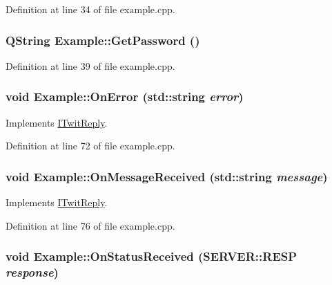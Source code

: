 Definition at line 34 of file example.cpp.\hypertarget{classExample_389fa677d9e04fdab94a987d2481640f}{
\subsubsection{\setlength{\rightskip}{0pt plus 5cm}QString Example::GetPassword ()}}
\label{classExample_389fa677d9e04fdab94a987d2481640f}




Definition at line 39 of file example.cpp.\hypertarget{classExample_5036bf79a0efef457605da87dafc5bce}{
\subsubsection{\setlength{\rightskip}{0pt plus 5cm}void Example::OnError (std::string {\em error})}}
\label{classExample_5036bf79a0efef457605da87dafc5bce}




Implements \hyperlink{classITwitReply_9cc4c9da62c570e6e076f2a7ce52b75a}{ITwitReply}.

Definition at line 72 of file example.cpp.\hypertarget{classExample_dfbedb6e9eeca0195736f6d3f89d25d8}{
\subsubsection{\setlength{\rightskip}{0pt plus 5cm}void Example::OnMessageReceived (std::string {\em message})}}
\label{classExample_dfbedb6e9eeca0195736f6d3f89d25d8}




Implements \hyperlink{classITwitReply_a103f872024b0a36e669b0d82a26a528}{ITwitReply}.

Definition at line 76 of file example.cpp.\hypertarget{classExample_f099176fe389428fa17ccd89f6514833}{
\subsubsection{\setlength{\rightskip}{0pt plus 5cm}void Example::OnStatusReceived ({\bf SERVER::RESP} {\em response})}}
\label{classExample_f099176fe389428fa17ccd89f6514833}




